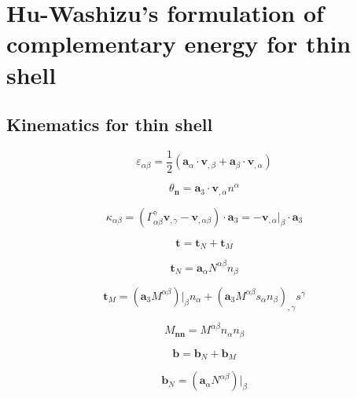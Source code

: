 \section{Hu-Washizu's formulation of complementary energy for thin shell}
\subsection{Kinematics for thin shell}
\begin{equation}
\varepsilon_{\alpha\beta} = \frac{1}{2}(\boldsymbol a_\alpha \cdot \boldsymbol v_{,\beta} + \boldsymbol a_\beta \cdot \boldsymbol v_{,\alpha})
\end{equation}

\begin{equation}
\theta_{\boldsymbol n} = \boldsymbol a_3 \cdot \boldsymbol v_{,\alpha} n^\alpha
\end{equation}

\begin{equation}
\kappa_{\alpha\beta} = (\Gamma^\gamma_{\alpha\beta} \boldsymbol v_{,\gamma} - \boldsymbol v_{,\alpha\beta}) \cdot \boldsymbol a_3 = - \boldsymbol v_{,\alpha}\vert_\beta \cdot \boldsymbol a_3
\end{equation}

\begin{equation}
\boldsymbol t = \boldsymbol t_N + \boldsymbol t_M
\end{equation}

\begin{equation}
\boldsymbol t_N = \boldsymbol a_\alpha N^{\alpha\beta} n_\beta
\end{equation}

\begin{equation}
\boldsymbol t_M = (\boldsymbol a_3 M^{\alpha\beta})\vert_\beta n_\alpha + (\boldsymbol a_3 M^{\alpha\beta} s_\alpha n_\beta)_{,\gamma} s^\gamma
\end{equation}

\begin{equation}
M_{\boldsymbol{nn}} = M^{\alpha\beta}n_\alpha n_\beta
\end{equation}

\begin{equation}
\boldsymbol b = \boldsymbol b_N + \boldsymbol b_M
\end{equation}

\begin{equation}
\boldsymbol b_N = (\boldsymbol a_\alpha N^{\alpha\beta})\vert_\beta
\end{equation}


